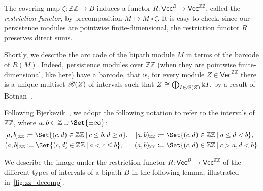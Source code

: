 \documentclass[a4paper,english,reqno]{amsart}
\newcommand{\deff}{\textit}
\renewcommand\k{\Bbbk}
\newcommand\iso{\cong}
\newcommand\ZZ{\mathbb{ZZ}}
\newcommand\Z{\mathbb{Z}}
\newcommand{\cat}[1]{\ensuremath{\mathsf{#1}}}
\renewcommand{\Vec}{\cat{Vec}}
\theoremstyle{plain}
\theoremstyle{definition} %
\providecommand\given{}
\newcommand\SetSymbol[1][]{%
  \nonscript\:#1\vert{}
  \allowbreak{}
  \nonscript\:
  \mathopen{}}
\renewcommand\given{\SetSymbol[]}
\begin{document}
The covering map $\zeta\colon\ZZ\to B$ induces a functor
$R\colon \Vec^{B}\to\Vec^{\ZZ}$, called the \deff{restriction functor},
by precomposition $M\mapsto M\circ\zeta$. It is easy to check, since our persistence modules are pointwise finite-dimensional, the restriction functor $R$ preserves direct sums.

Shortly, we describe the arc code of the bipath module $M$ in terms of the barcode of $R(M)$. Indeed, persistence modules over $\ZZ$ (when they are pointwise finite-dimensional, like here) have a barcode, that is, for every module $Z\in\Vec^{\ZZ}$ there is a unique multiset $\mathcal{B}(Z)$ of intervals such that $Z\iso \bigoplus_{I\in \barcode(Z)} \k I$, by a result of Botnan~\cite{botnanIntervalDecompositionInfinite2017}.

Following Bjerkevik~\cite{bjerkevikStabilityIntervalDecomposable2021}, we adopt
the following notation to refer to the intervals of $\ZZ$, where
$a, b\in\Z\cup\Set{\pm\infty}$:
\begin{align*}
  &[a,b]_{\ZZ} \coloneqq \Set{(c,d)\in\ZZ \given c\leq b, d\geq a},&[a, b)_{\ZZ} &\coloneqq \Set{(c,d)\in\ZZ \given a\leq d < b},\\
  &(a, b]_{\ZZ} \coloneqq \Set{(c, d)\in\ZZ \given a < c \leq b},&(a, b)_{\ZZ} &\coloneqq \Set{(c, d)\in\ZZ\given c > a, d < b}.
\end{align*}

We describe the image under the restriction functor
$R\colon \Vec^{B}\to\Vec^{\ZZ}$ of the different types of intervals of a bipath
$B$ in the following lemma, illustrated in~\cref{fig:zz_decomp}.
\end{document}
